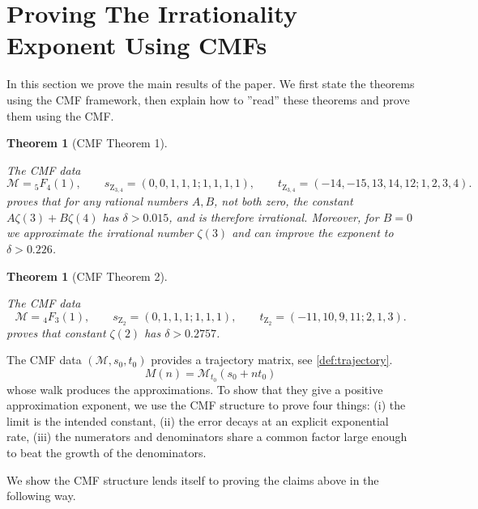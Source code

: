 \documentclass[oneside,english,11pt]{amsart}
\newtheorem{theorem}[thm]{Theorem}
\begin{document}
\section{Proving The Irrationality Exponent Using CMFs}
\label{sec:proof_strategy}

In this section we prove the main results of the paper. We first state the theorems using the CMF framework, then explain how to ''read'' these theorems and prove them using the CMF.
\begin{theorem}[CMF Theorem 1]
    \label{thm:cmf1}
    
    The CMF data
    \begin{equation*}
 \boxed{
 \mathcal M={}_5F_4(1),\qquad
 s_{\mathrm Z_{3,4}}=(0,0,1,1,1; 1,1,1,1),\qquad
 t_{\mathrm Z_{3,4}}=(-14,-15,13,14,12;1,2,3,4).
 }
\end{equation*}
    proves that for any rational numbers $A,B$, not both zero, the constant $A\zeta(3)+B\zeta(4)$ has $\delta>0.015$, and is therefore irrational. Moreover, for $B=0$ we approximate the irrational number $\zeta(3)$ and can improve the exponent to $\delta>0.226$.
\end{theorem}
\begin{theorem}[CMF Theorem 2]
    \label{thm:cmf2}
    
    The CMF data
    \begin{equation*}
 \boxed{
 \mathcal M={}_4F_3(1),\qquad
 s_{\mathrm Z_{2}}=(0,1,1,1; 1,1,1),\qquad
 t_{\mathrm Z_{2}}=(-11,10,9,11;2,1,3).
 }
\end{equation*}
    proves that constant $\zeta(2)$ has $\delta>0.2757$.
\end{theorem}

The CMF data $(\mathcal M,s_0,t_0)$ provides a trajectory matrix, see \ref{def:trajectory}.
\[
M(n)=\mathcal M_{t_0}(s_0+nt_0)
\]
whose walk produces the approximations. To show that they give a positive approximation exponent, we use the CMF structure to prove four things: (i) the limit is the intended constant, (ii) the error decays at an explicit exponential rate, (iii) the numerators and denominators share a common factor large enough to beat the growth of the denominators.

We show the CMF structure lends itself to proving the claims above in the following way.
\end{document}
